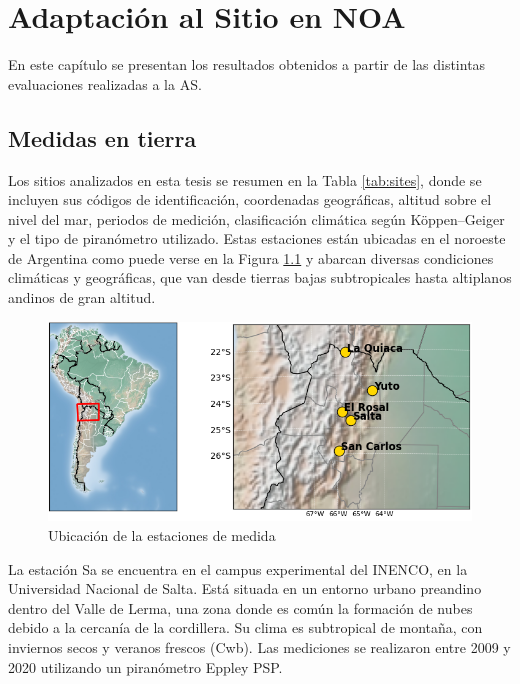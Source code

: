 \rhead{}
\cfoot{\thepage}
\renewcommand{\headrulewidth}{1pt}
\renewcommand{\footrulewidth}{1pt}
\chapter{Adaptación al Sitio en NOA}\label{ch_3}


En este capítulo se presentan los resultados obtenidos a partir de las distintas evaluaciones realizadas a la AS. 

\section{Medidas en tierra}


Los sitios analizados en esta tesis se resumen en la Tabla \ref{tab:sites}, donde se incluyen sus códigos de identificación, coordenadas geográficas, altitud sobre el nivel del mar, periodos de medición, clasificación climática según Köppen–Geiger \cite{peel2007} y el tipo de piranómetro utilizado. Estas estaciones  están ubicadas en el noroeste de Argentina como puede verse en la Figura \ref{fig:sites} y abarcan diversas condiciones climáticas y geográficas, que van desde tierras bajas subtropicales hasta altiplanos andinos de gran altitud.

\begin{figure}
   \centering
   \includegraphics[width=1\linewidth]{figuras/sites.png}
    \caption{Ubicación de la estaciones de medida}
    \label{fig:sites}
\end{figure}


La estación Sa se encuentra en el campus experimental del INENCO, en la Universidad Nacional de Salta. Está situada en un entorno urbano preandino dentro del Valle de Lerma, una zona donde es común la formación de nubes debido a la cercanía de la cordillera. Su clima es subtropical de montaña, con inviernos secos y veranos frescos (Cwb). Las mediciones se realizaron entre 2009 y 2020 utilizando un piranómetro Eppley PSP.\\

